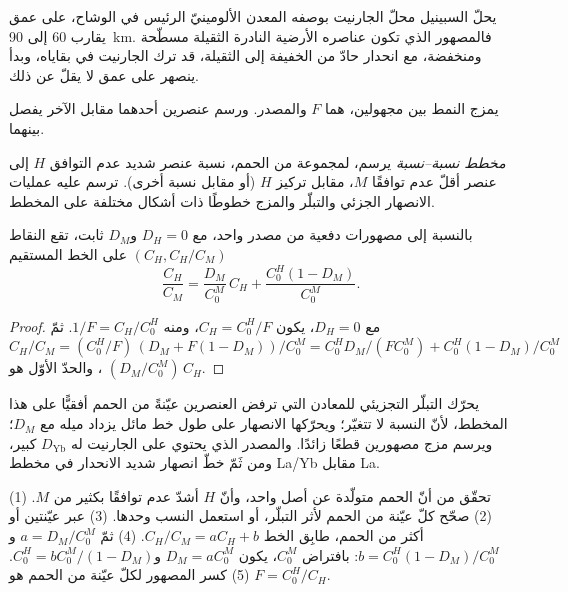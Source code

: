 يحلّ السبينيل محلّ الجارنيت بوصفه المعدن الألومينيّ الرئيس في الوشاح، على عمق يقارب 60
إلى \qty{90}{km}. فالمصهور الذي تكون عناصره الأرضية النادرة الثقيلة مسطّحة ومنخفضة، مع
انحدار حادّ من الخفيفة إلى الثقيلة، قد ترك الجارنيت في بقاياه، وبدأ
ينصهر على عمق لا يقلّ عن ذلك.

يمزج النمط بين مجهولين، هما $F$ والمصدر. ورسم عنصرين
أحدهما مقابل الآخر يفصل بينهما.

\begin{definition}\label{def:b3:trace-element-modelling:ratios}
\emph{مخطط نسبة--نسبة} يرسم، لمجموعة من الحمم،
نسبة عنصر شديد عدم التوافق $H$ إلى عنصر أقلّ عدم توافقًا $M$، مقابل تركيز $H$
(أو مقابل نسبة أخرى). ترسم عليه عمليات الانصهار الجزئي والتبلّر والمزج
خطوطًا ذات أشكال مختلفة
على المخطط.
\end{definition}

\begin{proposition}\label{prop:b3:trace-element-modelling:line}
بالنسبة إلى مصهورات دفعية من مصدر واحد، مع $D_H = 0$ و$D_M$ ثابت، تقع النقاط
$(C_H, C_H/C_M)$ على الخط المستقيم
\[
\frac{C_H}{C_M} = \frac{D_M}{C_0^M}\,C_H + \frac{C_0^H(1 - D_M)}{C_0^M}.
\]
\end{proposition}

\begin{proof}
مع $D_H = 0$، يكون $C_H = C_0^H/F$، ومنه $1/F = C_H/C_0^H$. ثمّ
$C_H/C_M = (C_0^H/F)\,(D_M + F(1 - D_M))/C_0^M = C_0^HD_M/(FC_0^M) +
C_0^H(1 - D_M)/C_0^M$، والحدّ الأوّل هو $(D_M/C_0^M)\,C_H$.
\end{proof}

يحرّك التبلّر التجزيئي للمعادن التي ترفض العنصرين عيّنةً من الحمم
أفقيًّا على هذا المخطط، لأنّ النسبة لا تتغيّر؛ ويحرّكها الانصهار
على طول خط مائل يزداد ميله مع $D_M$؛ ويرسم مزج مصهورين
قطعًا زائدًا. والمصدر الذي يحتوي على الجارنيت له $D_{\mathrm{Yb}}$ كبير، ومن ثَمّ خطّ
انصهار شديد الانحدار في مخطط La/Yb مقابل La.

\begin{method}\label{met:b3:trace-element-modelling:invert}
(1) تحقّق من أنّ الحمم متولّدة عن أصل واحد، وأنّ $H$ أشدّ عدم توافقًا
بكثير من $M$. (2) صحّح كلّ عيّنة من الحمم لأثر التبلّر، أو استعمل النسب وحدها.
(3) عبر عيّنتين أو أكثر من الحمم، طابِق الخط $C_H/C_M = aC_H + b$. (4) ثمّ
$a = D_M/C_0^M$ و$b = C_0^H(1 - D_M)/C_0^M$: بافتراض $C_0^M$، يكون $D_M =
aC_0^M$ و$C_0^H = bC_0^M/(1 - D_M)$. (5) كسر المصهور لكلّ عيّنة من الحمم
هو $F = C_0^H/C_H$.
\end{method}

